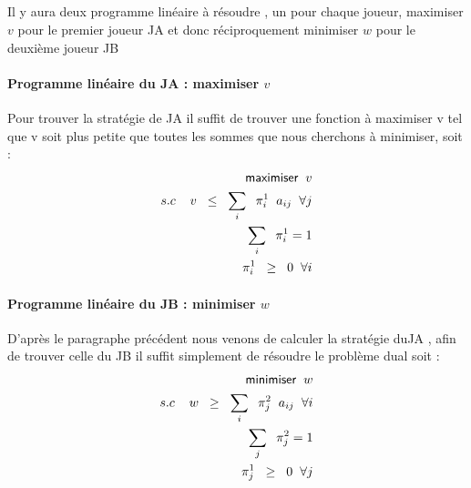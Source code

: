 \documentclass[a4paper, 12pt, twoside]{article}
\begin{document}
{{{\subparagraph*{}{Il y aura deux programme linéaire à résoudre , un pour chaque joueur, maximiser $v$ pour le premier joueur \textsf{\textsf{JA}} et donc réciproquement minimiser $w$ pour le deuxième joueur \textsf{JB}


\paragraph{Programme linéaire du JA : maximiser $v$}{Pour trouver la stratégie de JA il suffit de trouver une fonction à maximiser \textsf{v} tel que \textsf{v} soit plus petite que toutes les sommes que nous cherchons à minimiser, soit :}
\begin{align*}
\textsf{maximiser} \hspace{0,2 cm} v \\ 
 s.c \hspace{0.4 cm} v \hspace{0,2 cm}  \leq  \hspace{0.2 cm}\sum_{i}\hspace{0.2 cm} \pi_{i}^{1}\hspace{0.2 cm} a _{ij} \hspace{0,2 cm} \forall j\\
\sum_{i} \hspace{0.2 cm} \pi_{i}^{1} =1 \\ 
\pi_{i}^{1} \hspace{0,2 cm} \geq \hspace{0,2 cm} 0 \hspace{0,2 cm} \forall i 
\end{align*}

\paragraph{Programme linéaire du JB : minimiser $w$}{D'après le paragraphe précédent nous venons de calculer la stratégie du\textsf{JA} , afin de trouver celle du \textsf{JB} il suffit simplement de résoudre le problème dual soit :}
\begin{align*}
\textsf{minimiser} \hspace{0,2 cm} w \\ 
 s.c \hspace{0.4 cm} w \hspace{0,2 cm}  \geq  \hspace{0.2 cm}\sum_{i}\hspace{0.2 cm} \pi_{j}^{2}\hspace{0.2 cm} a _{ij} \hspace{0,2 cm} \forall i\\
\sum_{j} \hspace{0.2 cm} \pi_{j}^{2} =1 \\ 
\pi_{j}^{1} \hspace{0,2 cm} \geq \hspace{0,2 cm} 0 \hspace{0,2 cm} \forall j
\end{align*}


}}}}
\end{document}
